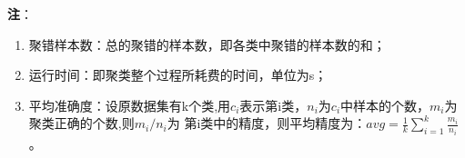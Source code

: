 \textbf{注}：

\begin{enumerate}
\def\labelenumi{(\arabic{enumi})}
\item
  聚错样本数：总的聚错的样本数，即各类中聚错的样本数的和；\\
\item
  运行时间：即聚类整个过程所耗费的时间，单位为s；\\
\item
  平均准确度：设原数据集有k个类,用$c_i$表示第i类，$n_i$为$c_i$中样本的个数，$m_i$为聚类正确的个数,则$m_i/n_i$为
  第i类中的精度，则平均精度为：$avg=\frac{1}{k}\sum_{i=1}^{k}\frac{m_{i}}{n_{i}}$。
\end{enumerate}



